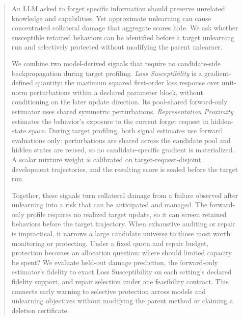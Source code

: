 \begin{abstract}
An LLM asked to forget specific information should preserve unrelated
knowledge and capabilities. Yet approximate unlearning can cause concentrated
collateral damage that aggregate scores hide. We ask whether susceptible
retained behaviors can be identified before a target unlearning run and
selectively protected without modifying the parent unlearner.

We combine two model-derived signals that require no candidate-side
backpropagation during target profiling. \emph{Loss Susceptibility} is a
gradient-defined quantity: the maximum squared first-order loss response over
unit-norm perturbations within a declared parameter block, without conditioning
on the later update direction. Its pool-shared forward-only estimator uses
shared symmetric perturbations.
\emph{Representation Proximity} estimates the behavior's exposure to the
current forget request in hidden-state space. During target profiling, both
signal estimates use forward evaluations only: perturbations are shared across
the candidate pool and hidden states are reused, so no candidate-specific
gradient is materialized. A scalar mixture weight is calibrated on
target-request-disjoint development trajectories, and the resulting score is
sealed before the target run.

Together, these signals turn collateral damage from a failure observed after
unlearning into a risk that can be anticipated and managed. The forward-only
profile requires no realized target update, so it can screen retained
behaviors before the target trajectory. When exhaustive auditing or repair is
impractical, it narrows a large candidate universe to those most worth
monitoring or protecting. Under a fixed quota and repair budget, protection
becomes an allocation question: where should limited capacity be spent? We
evaluate held-out damage prediction, the forward-only estimator's fidelity to
exact Loss Susceptibility on each setting's declared fidelity support, and
repair selection under one feasibility contract.  This connects
early warning to selective protection across models and unlearning objectives
without modifying the parent method or claiming a deletion certificate.

\end{abstract}
